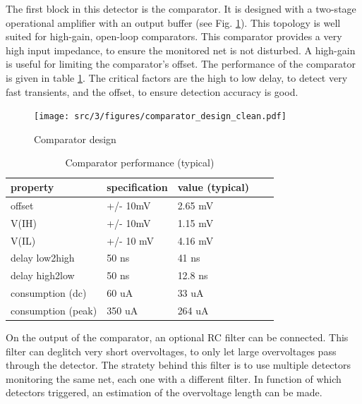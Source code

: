 The first block in this detector is the comparator.
It is designed with a two-stage operational amplifier with an output buffer (see Fig. \ref{fig:comparator-design}).
This topology is well suited for high-gain, open-loop comparators.
This comparator provides a very high input impedance, to ensure the monitored net is not disturbed.
A high-gain is useful for limiting the comparator's offset.
The performance of the comparator is given in table \ref{tab:comparator-performance}.
The critical factors are the high to low delay, to detect very fast transients, and the offset, to ensure detection accuracy is good.

\begin{figure}[!h]
  \centering
  \texttt{[image: src/3/figures/comparator\_design\_clean.pdf]}
  \caption{Comparator design}
  \label{fig:comparator-design}
\end{figure}


\begin{table}[!h]
\centering
\begin{tabular}{@{}lllll@{}}
\toprule
property           & specification & value (typical) \\
\midrule
offset             & +/- 10mV      & 2.65 mV \\
V(IH)              & +/- 10mV      & 1.15 mV \\
V(IL)              & +/- 10 mV     & 4.16 mV \\
delay low2high     & 50 ns         & 41 ns   \\
delay high2low     & 50 ns         & 12.8 ns \\
consumption (dc)   & 60 uA         & 33 uA \\
consumption (peak) & 350 uA        & 264 uA \\
\bottomrule
\end{tabular}
\caption{Comparator performance (typical)}
\label{tab:comparator-performance}
\end{table}


On the output of the comparator, an optional RC filter can be connected.
This filter can deglitch very short overvoltages, to only let large overvoltages pass through the detector.
The stratety behind this filter is to use multiple detectors monitoring the same net, each one with a different filter.
In function of which detectors triggered, an estimation of the overvoltage length can be made.


